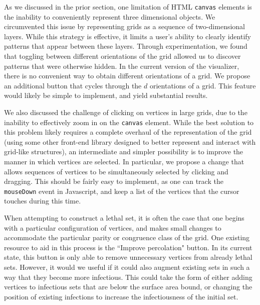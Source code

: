 
As we discussed in the prior section, one limitation of HTML \texttt{canvas} elements is the inability to conveniently represent three dimensional objects. We circumvented this issue by representing grids as a sequence of two-dimensional layers. While this strategy is effective, it limits a user's ability to clearly identify patterns that appear between these layers. Through experimentation, we found that toggling between different orientations of the grid allowed us to discover patterns that were otherwise hidden. In the current version of the visualizer, there is no convenient way to obtain different orientations of a grid. We propose an additional button that cycles through the $d$ orientations of a grid. This feature would likely be simple to implement, and yield substantial results.

We also discussed the challenge of clicking on vertices in large grids, due to the inability to effectively zoom in on the \texttt{canvas} element. While the best solution to this problem likely requires a complete overhaul of the representation of the grid (using some other front-end library designed to better represent and interact with grid-like structures), an intermediate and simpler possibility is to improve the manner in which vertices are selected. In particular, we propose a change that allows sequences of vertices to be simultaneously selected by clicking and dragging. This should be fairly easy to implement, as one can track the \texttt{mouseDown} event in Javascript, and keep a list of the vertices that the cursor touches during this time.  

When attempting to construct a lethal set, it is often the case that one begins with a particular configuration of vertices, and makes small changes to accommodate the particular parity or congruence class of the grid. One existing resource to aid in this process is the ``Improve percolation" button. In its current state, this button is only able to remove unnecessary vertices from already lethal sets. However, it would we useful if it could also augment existing sets in such a way that they become more infectious. This could take the form of either adding vertices to infectious sets that are below the surface area bound, or changing the position of existing infections to increase the infectiousness of the initial set. 

